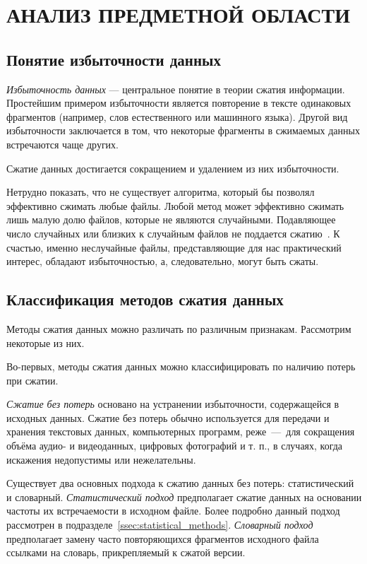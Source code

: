 \section[Анализ предметной области]{АНАЛИЗ ПРЕДМЕТНОЙ ОБЛАСТИ}

\subsection{Понятие избыточности данных}

\textit{Избыточность данных} --- центральное понятие в теории сжатия информации.
Простейшим примером избыточности является повторение в тексте одинаковых
фрагментов (например, слов естественного или машинного языка).
Другой вид избыточности заключается в том,
что некоторые фрагменты в сжимаемых данных встречаются чаще других.

Сжатие данных достигается сокращением и удалением из них
избыточности.

Нетрудно показать, что не существует алгоритма, который бы позволял
эффективно сжимать любые файлы.
Любой метод может эффективно сжимать лишь малую долю файлов,
которые не являются случайными. 
Подавляющее число случайных или близких к
случайным файлов не поддается сжатию~\cite{salmon2004}. 
К счастью, именно неслучайные файлы,
представляющие для нас практический интерес,
обладают избыточностью, а, следовательно, могут быть сжаты.

\subsection{Классификация методов сжатия данных}

Методы сжатия данных можно различать по различным признакам.
Рассмотрим некоторые из них.

Во-первых, методы сжатия данных можно классифицировать 
по наличию потерь при сжатии.

\textit{Сжатие без потерь} основано на устранении избыточности, 
содержащейся в исходных данных. 
Сжатие без потерь обычно используется для передачи и хранения текстовых данных,
компьютерных программ, реже~---~для сокращения объёма аудио- и видеоданных,
цифровых фотографий и т. п., в случаях,
когда искажения недопустимы или нежелательны.

Существует два основных подхода к сжатию данных без потерь:
статистический и словарный. 
\textit{Статистический подход} предполагает сжатие данных
на основании частоты их встречаемости в исходном файле. Более подробно
данный подход рассмотрен в подразделе~\ref{ssec:statistical_methods}.
\textit{Словарный подход} предполагает замену часто повторяющихся фрагментов
исходного файла ссылками на словарь, прикрепляемый к сжатой версии. 

